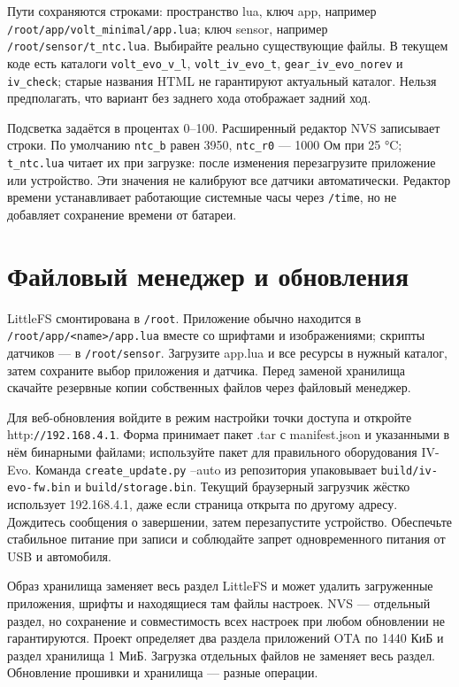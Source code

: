 Пути сохраняются строками: пространство lua, ключ app, например \nolinkurl{/root/app/volt_minimal/app.lua}; ключ sensor, например \nolinkurl{/root/sensor/t_ntc.lua}. Выбирайте реально существующие файлы. В текущем коде есть каталоги \nolinkurl{volt_evo_v_l}, \nolinkurl{volt_iv_evo_t}, \nolinkurl{gear_iv_evo_norev} и \nolinkurl{iv_check}; старые названия HTML не гарантируют актуальный каталог. Нельзя предполагать, что вариант без заднего хода отображает задний ход.

Подсветка задаётся в процентах 0–100. Расширенный редактор NVS записывает строки. По умолчанию \nolinkurl{ntc_b} равен 3950, \nolinkurl{ntc_r0} — 1000 Ом при 25 °C; \nolinkurl{t_ntc.lua} читает их при загрузке: после изменения перезагрузите приложение или устройство. Эти значения не калибруют все датчики автоматически. Редактор времени устанавливает работающие системные часы через \nolinkurl{/time}, но не добавляет сохранение времени от батареи.

\section{Файловый менеджер и обновления}
LittleFS смонтирована в \nolinkurl{/root}. Приложение обычно находится в \nolinkurl{/root/app/<name>/app.lua} вместе со шрифтами и изображениями; скрипты датчиков — в \nolinkurl{/root/sensor}. Загрузите app.lua и все ресурсы в нужный каталог, затем сохраните выбор приложения и датчика. Перед заменой хранилища скачайте резервные копии собственных файлов через файловый менеджер.

Для веб-обновления войдите в режим настройки точки доступа и откройте http:\nolinkurl{//192.168.4.1}. Форма принимает пакет .tar с manifest.json и указанными в нём бинарными файлами; используйте пакет для правильного оборудования IV-Evo. Команда \nolinkurl{create_update.py} --auto из репозитория упаковывает \nolinkurl{build/iv-evo-fw.bin} и \nolinkurl{build/storage.bin}. Текущий браузерный загрузчик жёстко использует 192.168.4.1, даже если страница открыта по другому адресу. Дождитесь сообщения о завершении, затем перезапустите устройство. Обеспечьте стабильное питание при записи и соблюдайте запрет одновременного питания от USB и автомобиля.

Образ хранилища заменяет весь раздел LittleFS и может удалить загруженные приложения, шрифты и находящиеся там файлы настроек. NVS — отдельный раздел, но сохранение и совместимость всех настроек при любом обновлении не гарантируются. Проект определяет два раздела приложений OTA по 1440 КиБ и раздел хранилища 1 МиБ. Загрузка отдельных файлов не заменяет весь раздел. Обновление прошивки и хранилища — разные операции.


